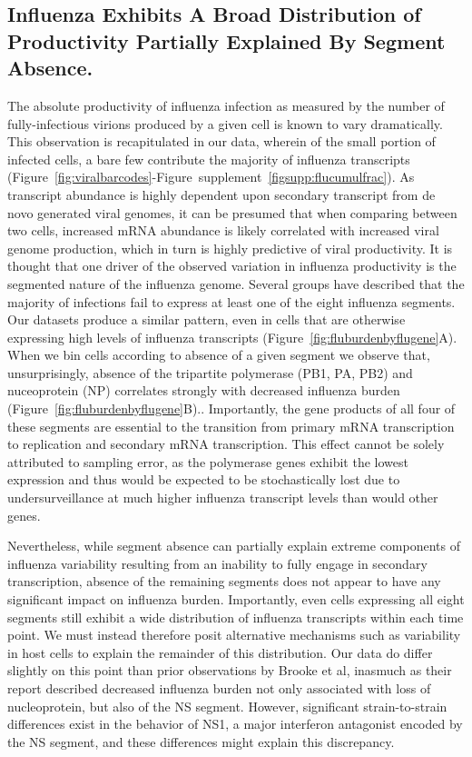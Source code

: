 \documentclass[9pt,lineno]{elife}
\begin{document}
\subsection{Influenza Exhibits A Broad Distribution of Productivity Partially Explained By Segment Absence.}
The absolute productivity of influenza infection as measured by the number of fully-infectious virions produced by a given cell is known to vary dramatically.  
This observation is recapitulated in our data, wherein of the small portion of infected cells, a bare few contribute the majority of influenza transcripts (Figure~\ref{fig:viralbarcodes}-Figure~supplement~\ref{figsupp:flucumulfrac}). 
As transcript abundance is highly dependent upon secondary transcript from de novo generated viral genomes, it can be presumed that when comparing between two cells, increased mRNA abundance is likely correlated with increased viral genome production, which in turn is highly predictive of viral productivity. It is thought that one driver of the observed variation in influenza productivity is the segmented nature of the influenza genome. Several groups have described that the majority of infections fail to express at least one of the eight influenza segments. Our datasets produce a similar pattern, even in cells that are otherwise expressing high levels of influenza transcripts (Figure~\ref{fig:fluburdenbyflugene}A). When we bin cells according to absence of a given segment we observe that, unsurprisingly, absence of the tripartite polymerase (PB1, PA, PB2) and nuceoprotein (NP) correlates strongly with decreased influenza burden (Figure~\ref{fig:fluburdenbyflugene}B).. Importantly, the gene products of all four of these segments are essential to the transition from primary mRNA transcription to replication and secondary mRNA transcription. This effect cannot be solely attributed to sampling error, as the polymerase genes exhibit the lowest expression and thus would be expected to be stochastically lost due to undersurveillance at much higher influenza transcript levels than would other genes. 

	Nevertheless, while segment absence can partially explain extreme components of influenza variability resulting from an inability to fully engage in secondary transcription, absence of the remaining segments does not appear to have any significant impact on influenza burden. Importantly, even cells expressing all eight segments still exhibit a wide distribution of influenza transcripts within each time point. We must instead therefore posit alternative mechanisms such as variability in host cells to explain the remainder of this distribution.  Our data do differ slightly on this point than prior observations by Brooke et al, inasmuch as their report described decreased influenza burden not only associated with loss of nucleoprotein, but also of the NS segment. However, significant strain-to-strain differences exist in the behavior of NS1, a major interferon antagonist encoded by the NS segment, and these differences might explain this discrepancy. 
\end{document}
